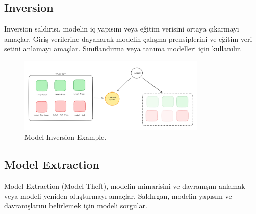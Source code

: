 \newpage

\subsection{Inversion}
Inversion saldırısı, modelin iç yapısını veya eğitim verisini ortaya çıkarmayı amaçlar. Giriş verilerine dayanarak modelin çalışma prensiplerini ve eğitim veri setini anlamayı amaçlar. Sınıflandırma veya tanıma modelleri için kullanılır.

\begin{figure}[h]
  \centering
  \includegraphics[width=0.8\textwidth]{images/ai_sec_model_inversion.png}
  \caption{Model Inversion Example.}
\end{figure}

\newpage

\subsection{Model Extraction}
Model Extraction (Model Theft), modelin mimarisini ve davranışını anlamak veya modeli yeniden oluşturmayı amaçlar. Saldırgan, modelin yapısını ve davranışlarını belirlemek için modeli sorgular. 

\newpage